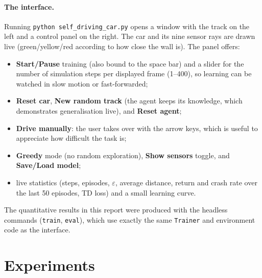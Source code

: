 \documentclass[11pt,a4paper]{article}
\newcommand{\code}[1]{\texttt{#1}}
\begin{document}
\paragraph{The interface.}
Running \code{python self\_driving\_car.py} opens a window with the track on the left and a control panel on the right.
The car and its nine sensor rays are drawn live (green/yellow/red according to how close the wall is).
The panel offers:
\begin{itemize}
  \item \textbf{Start/Pause} training (also bound to the space bar) and a slider for the number of simulation steps per displayed frame (1--400), so learning can be watched in slow motion or fast-forwarded;
  \item \textbf{Reset car}, \textbf{New random track} (the agent keeps its knowledge, which demonstrates generalisation live), and \textbf{Reset agent};
  \item \textbf{Drive manually}: the user takes over with the arrow keys, which is useful to appreciate how difficult the task is;
  \item \textbf{Greedy} mode (no random exploration), \textbf{Show sensors} toggle, and \textbf{Save/Load model};
  \item live statistics (steps, episodes, \(\varepsilon\), average distance, return and crash rate over the last 50 episodes, TD loss) and a small learning curve.
\end{itemize}
The quantitative results in this report were produced with the headless commands (\code{train}, \code{eval}), which use exactly the same \code{Trainer} and environment code as the interface.

\section{Experiments}
\end{document}
